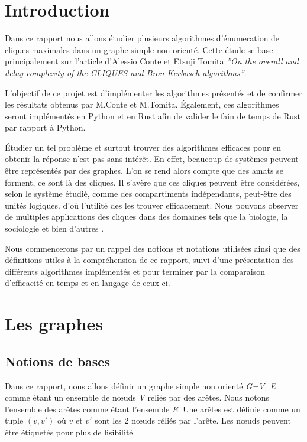 \documentclass[12pt,a4paper]{article}
\begin{document}
\tableofcontents

\newpage

\section{Introduction}


Dans ce rapport nous allons étudier plusieurs algorithmes d'énumeration de cliques maximales dans un graphe simple non orienté. Cette étude se base principalement sur l'article d'Alessio Conte et Etsuji Tomita  \textit{''On the overall and delay complexity of the CLIQUES and Bron-Kerbosch algorithms''}.

L'objectif de ce projet est d'implémenter les algorithmes présentés et de confirmer les résultats obtenus par M.Conte et M.Tomita. Également, ces algorithmes seront implémentés en Python et en Rust afin de valider le fain de temps de Rust par rapport à Python.

Étudier un tel problème et surtout trouver des algorithmes efficaces pour en obtenir la réponse n'est pas sans intérêt. En effet, beaucoup de systèmes peuvent être représentés par des graphes. L'on se rend alors compte que des amats se forment, ce sont là des cliques. Il s'avère que ces cliques peuvent être considérées, selon le système étudié, comme des compartiments indépendants, peut-être des unités logiques. d'où l'utilité des les trouver efficacement. Nous pouvons observer de multiples applications des cliques dans des domaines tels que la biologie, la sociologie et bien d'autres \cite{FORTUNATO201075}.

Nous commencerons par un rappel des notions et notations utilisées ainsi que des définitions utiles à la compréhension de ce rapport, suivi d'une présentation des différents algorithmes implémentés et pour terminer par la comparaison d'efficacité en temps et en langage de ceux-ci.

\section{Les graphes}%
\label{sec:graphes}

\subsection{Notions de bases}

Dans ce rapport, nous allons définir un graphe simple non orienté \emph{G=V, E} comme étant un ensemble de nœuds \emph{V} reliés par des arêtes. Nous notons l'ensemble des arêtes comme étant l'ensemble \emph{E}. Une arêtes est définie comme un tuple $ (v, v') $ où $ v $ et $ v' $ sont les 2 nœuds réliés par l'arête. Les nœuds peuvent être étiquetés pour plus de lisibilité.
\end{document}
